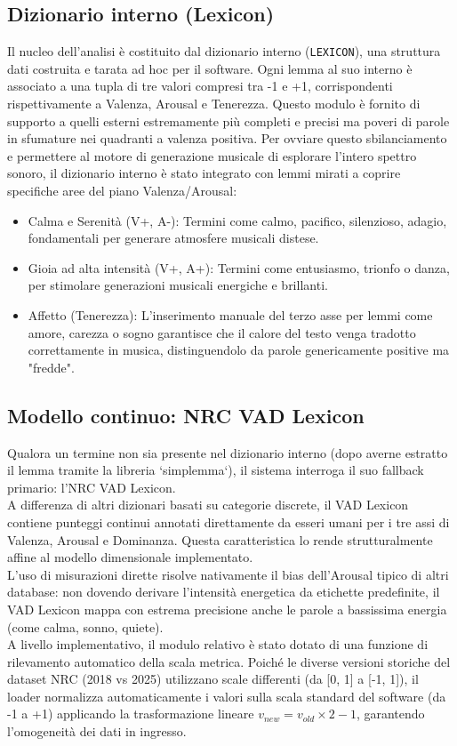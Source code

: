 \subsection{Dizionario interno (Lexicon)}
Il nucleo dell'analisi è costituito dal dizionario interno (\texttt{LEXICON}), una struttura dati costruita e tarata ad hoc per il software. 
Ogni lemma al suo interno è associato a una tupla di tre valori compresi tra -1 e +1, corrispondenti rispettivamente a Valenza, Arousal e Tenerezza. 
Questo modulo è fornito di supporto a quelli esterni estremamente più completi e precisi ma poveri di parole in sfumature nei quadranti a valenza positiva.
Per ovviare questo sbilanciamento e permettere al motore di generazione musicale di esplorare l'intero spettro sonoro, il dizionario interno è stato 
integrato con lemmi mirati a coprire specifiche aree del piano Valenza/Arousal: 
\begin{itemize}
    \item Calma e Serenità (V+, A-): Termini come calmo, pacifico, silenzioso, adagio, fondamentali per generare atmosfere musicali distese.
    \item Gioia ad alta intensità (V+, A+): Termini come entusiasmo, trionfo o danza, per stimolare generazioni musicali energiche e brillanti.
    \item  Affetto (Tenerezza): L'inserimento manuale del terzo asse per lemmi come amore, carezza o sogno garantisce che il calore del testo venga 
    tradotto correttamente in musica, distinguendolo da parole genericamente positive ma "fredde".
\end{itemize}

\subsection{Modello continuo: NRC VAD Lexicon}
Qualora un termine non sia presente nel dizionario interno (dopo averne estratto il lemma tramite la libreria `simplemma`), il sistema interroga il suo 
fallback primario: l'NRC VAD Lexicon.\\
A differenza di altri dizionari basati su categorie discrete, il VAD Lexicon contiene punteggi continui annotati direttamente da esseri umani per i tre 
assi di Valenza, Arousal e Dominanza. Questa caratteristica lo rende strutturalmente affine al modello dimensionale implementato.\\
L'uso di misurazioni dirette risolve nativamente il bias dell'Arousal tipico di altri database: non dovendo derivare l'intensità energetica da 
etichette predefinite, il VAD Lexicon mappa con estrema precisione anche le parole a bassissima energia (come calma, sonno, quiete).\\
A livello implementativo, il modulo relativo è stato dotato di una funzione di rilevamento automatico della scala metrica. Poiché le diverse versioni 
storiche del dataset NRC (2018 vs 2025) utilizzano scale differenti (da [0, 1] a [-1, 1]), il loader normalizza automaticamente i valori sulla 
scala standard del software (da -1 a +1) applicando la trasformazione lineare $v_{\mathit{new}} = v_{\mathit{old}} \times 2 - 1$, garantendo l'omogeneità 
dei dati in ingresso.


